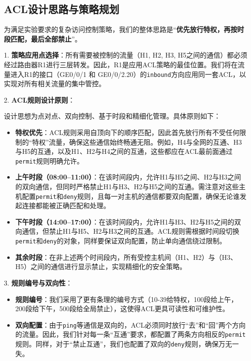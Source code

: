 \documentclass[12pt, a4paper]{article}
\begin{document}
\subsection{ACL设计思路与策略规划}

为满足实验要求的复杂访问控制策略，我们的整体思路是“\textbf{优先放行特权，再按时段匹配，最后全部禁止}”。

1. \textbf{策略应用点选择}：所有需要被控制的流量（H1, H2, H3, H5之间的通信）都必须经过路由器R1进行三层转发。因此，R1是应用ACL策略的最佳位置。我们将在流量进入R1的接口（GE0/0/1 和 GE0/0/2.20）的\texttt{inbound}方向应用同一套ACL，以实现对所有相关流量的集中管控。

2. \textbf{ACL规则设计原则}：
    
    设计思想为点对点、双向控制、基于时段和精细化管理。具体原则如下：
    \begin{itemize}
        \item \textbf{特权优先}：ACL规则采用自顶向下的顺序匹配，因此首先放行所有不受任何限制的“特权”流量，确保这些通信始终畅通无阻。例如，H4与全网的互通、H3与H5的互通，以及H1、H2与H4之间的互通，这些都应在ACL最前面通过\texttt{permit}规则明确允许。
        \item \textbf{上午时段（08:00--11:00）}：在该时间段内，允许H1与H5之间、H2与H3之间的双向通信，但同时严格禁止H1与H3、H2与H5之间的互通。需注意对这些主机配置\texttt{permit}和\texttt{deny}规则，且每一对主机的通信都要双向配置，确保无论谁发起连接都能被正确匹配和处理。
        \item \textbf{下午时段（14:00--17:00）}：在该时间段内，允许H1与H3、H2与H5之间的双向通信，但禁止H1与H5、H2与H3之间的互通。ACL规则需根据时间段切换\texttt{permit}和\texttt{deny}的对象，同样要保证双向配置，防止单向通信绕过限制。
        \item \textbf{其余时段}：在非上述两个时间段内，所有受控主机间（H1、H2）与（H3、H5）之间的通信进行显示禁止，实现精细化的安全策略。
    \end{itemize}

3. \textbf{规则编号与双向性}：
    \begin{itemize}
        \item \textbf{规则编号}：我们采用了更有条理的编号方式（10-39给特权，100段给上午，200段给下午，500段给全局禁止），这使得ACL更具可读性和可维护性。
        \item \textbf{双向配置}：由于\texttt{ping}等通信是双向的，ACL必须同时放行“去”和“回”两个方向的流量。因此，我们针对每一条“互通”要求，都配置了两条方向相反的\texttt{permit}规则。同样，对于“禁止互通”，我们也配置了双向的\texttt{deny}规则，确保万无一失。
    \end{itemize}
\end{document}
